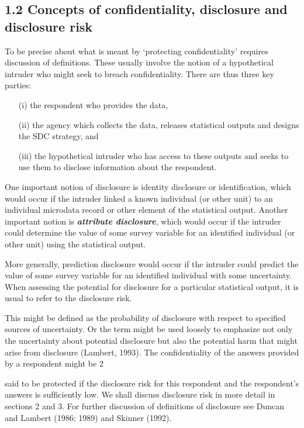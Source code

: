 \subsection*{1.2 Concepts of confidentiality, disclosure and disclosure risk}
To be precise about what is meant by ‘protecting confidentiality’ requires discussion
of definitions. These usually involve the notion of a hypothetical intruder who might seek
to breach conﬁdentiality. 
There are thus three key parties: 
\begin{itemize}
\item[(i)] the respondent who provides the data, 
\item[(ii)] the agency which collects the data, releases statistical outputs and
designs the SDC strategy, and 
\item[(iii)] the hypothetical intruder who has access to these
outputs and seeks to use them to disclose information about the respondent.
\end{itemize}

 One
important notion of disclosure is identity disclosure or identification, which would occur
if the intruder linked a known individual (or other unit) to an individual microdata record
or other element of the statistical output. Another important notion is \textbf{\textit{attribute disclosure}},
which would occur if the intruder could determine the value of some survey variable for
an identified individual (or other unit) using the statistical output. 

More generally,
prediction disclosure would occur if the intruder could predict the value of some survey
variable for an identiﬁed individual with some uncertainty. When assessing the potential
for disclosure for a particular statistical output, it is usual to refer to the disclosure risk.

This might be defined as the probability of disclosure with respect to specified sources of
uncertainty. Or the term might be used loosely to emphasize not only the uncertainty
about potential disclosure but also the potential harm that might arise from disclosure
(Lambert, 1993). The conﬁdentiality of the answers provided by a respondent might be
2



said to be protected if the disclosure risk for this respondent and the respondent’s answers
is sufﬁciently low. We shall discuss disclosure risk in more detail in sections 2 and 3.
For further discussion of deﬁnitions of disclosure see Duncan and Lambert (1986; 1989)
and Skinner (1992).
